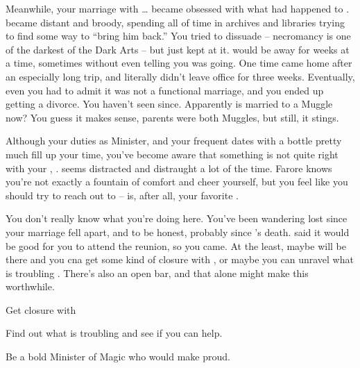 \documentclass[char]{Katmeers}
\begin{document}
Meanwhile, your marriage with \cHermione{}\ldots{} \cHermione{} became obsessed with what had happened to \cHarry{}. \cHermione{\They} became distant and broody, spending all of \cHermione{\their} time in archives and libraries trying to find some way to ``bring him back.'' You tried to dissuade \cHermione{\them} -- necromancy is one of the darkest of the Dark Arts -- but \cHermione{\they} just kept at it. \cHermione{\They} would be away for weeks at a time, sometimes without even telling you \cHermione{\they} was going. One time \cHermione{\they} came home after an especially long trip, and literally didn't leave \cHermione{\their} office for three weeks. Eventually, even you had to admit it was not a functional marriage, and you ended up getting a divorce. You haven't seen \cHermione{\them} since. Apparently \cHermione{\they} is married to a Muggle now? You guess it makes sense, \cHermione{\their} parents were both Muggles, but still, it stings.

Although your duties as Minister, and your frequent dates with a bottle pretty much fill up your time, you've become aware that something is not quite right with your \cGinny{\sibling}, \cGinny{}. \cGinny{\They} seems distracted and distraught a lot of the time. Farore knows you're not exactly a fountain of comfort and cheer yourself, but you feel like you should try to reach out to \cGinny{\them} -- \cGinny{\they} is, after all,  your favorite \cGinny{\sibling}.

You don't really know what you're doing here. You've been wandering lost since your marriage fell apart, and to be honest, probably since \cHarry{}'s death. \cLucius{} said it would be good for you to attend the reunion, so you came.  At the least, maybe \cHermione{} will be there and you cna get some kind of closure with \cHermione{\them}, or maybe you can unravel what is troubling \cGinny{}. There's also an open bar, and that alone might make this worthwhile.


\begin{itemz}[Goals]
	\item Get closure with \cHermione{}
	\item Find out what is troubling \cGinny{} and see if you can help.
	\item Be a bold Minister of Magic who would make \cHarry{} proud.
\end{itemz}

\begin{itemz}[Notes]
	\item 
\end{itemz}
\end{document}

